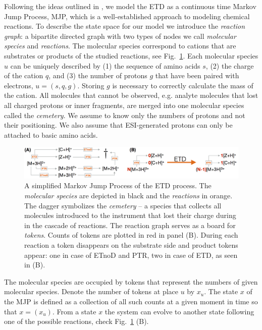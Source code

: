 \documentclass{llncs}
\begin{document}
Following the ideas outlined in \cite{Gambin2010}, we model the ETD as a continuous time Markov Jump Process, MJP, which is a well-established approach to modeling chemical reactions.
To describe the state space for our model we introduce the \textit{reaction graph}: a bipartite directed graph with two types of nodes we call \textit{molecular species} and \textit{reactions}. The molecular species correspond to cations that are substrates or products of the studied reactions, see Fig.~\ref{img::petrinet}. Each molecular species $u$ can be uniquely described by (1) the sequence of amino acids $s$, (2) the charge of the cation $q$, and (3) the number of protons $g$ that have been paired with electrons, $u = (s,q,g)$. Storing $g$ is necessary to correctly calculate the mass of the cation. All molecules that cannot be observed, e.g. analyte molecules that lost all charged protons or inner fragments, are merged into one molecular species called the \textit{cemetery}. We assume to know only the numbers of protons and not their positioning. We also assume that ESI-generated protons can only be attached to basic amino acids.
\begin{figure}[h]
        \center
        \includegraphics[width=\textwidth]{petrinet.png}
        \caption{A simplified Markov Jump Process of the ETD process. The \textit{molecular species} are depicted in black and the \textit{reactions} in orange. The dagger symbolizes the \textit{cemetery} -- a species that collects all molecules introduced to the instrument that lost their charge during in the cascade of reactions. The reaction graph serves as a board for \textit{tokens}. Counts of tokens are plotted in red in panel (B). During each reaction a token disappears on the substrate side and product tokens appear: one in case of ETnoD and PTR, two in case of ETD, as seen in (B).}\label{img::petrinet}
\end{figure}

The molecular species are occupied by tokens that represent the numbers of given molecular species.
Denote the number of tokens at place $u$ by $x_u$. The state $x$ of the MJP is defined as a collection of all such counts at a given moment in time so that $x = (x_u)$.  From a state $x$ the system can evolve to another state following one of the possible reactions, check Fig.~\ref{img::petrinet} (B).
\end{document}
